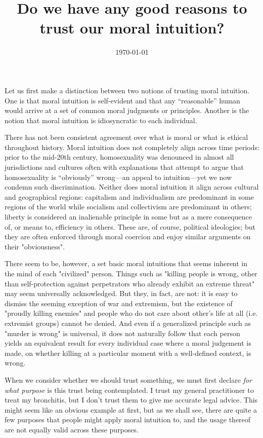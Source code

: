 \documentclass{scrartcl}
\title{Do we have any good reasons to trust our moral intuition?}
\author{\today}
\date{}
\begin{document}
\maketitle


Let us first make a distinction between two notions of trusting moral intuition. One is that moral intuition is self-evident and that any ``reasonable'' human would arrive at a set of common moral judgments or principles. Another is the notion that moral intuition is idiosyncratic to each individual.

There has not been consistent agreement over what is moral or what is ethical throughout history. Moral intuition does not completely align across time periods: prior to the mid-20th century, homosexuality was denounced in almost all jurisdictions and cultures often with explanations that attempt to argue that homosexuality is ``obviously'' wrong---an appeal to intuition---yet we now condemn such discrimination. Neither does moral intuition it align across cultural and geographical regions: capitalism and individualism are predominant in some regions of the world while socialism and collectivism are predominant in others; liberty is considered an inalienable principle in some but as a mere consequence of, or means to, efficiency in others. These are, of course, political ideologies; but they are often enforced through moral coercion and enjoy similar arguments on their "obviousness".

There seem to be, however, a set basic moral intuitions that seems inherent in the mind of each "civilized" person. Things such as "killing people is wrong, other than self-protection against perpetrators who already exhibit an extreme threat" may seem universally acknowledged. But they, in fact, are not: it is easy to dismiss the seeming exception of war and extremism, but the existence of "proudly killing enemies" and people who do not care about other's life at all (i.e. extremist groups) cannot be denied. And even if a generalized principle such as "murder is wrong" is universal, it does not naturally follow that each person yields an equivalent result for every individual case where a moral judgement is made, on whether killing at a particular moment with a well-defined context, is wrong.


When we consider whether we should trust something, we must first declare \emph{for what purpose} is this trust being contemplated. I trust my general practitioner to treat my bronchitis, but I don't trust them to give me accurate legal advice. This might seem like an obvious example at first, but as we shall see, there are quite a few purposes that people might apply moral intuition to, and the usage thereof are not equally valid across these purposes.
\end{document}
